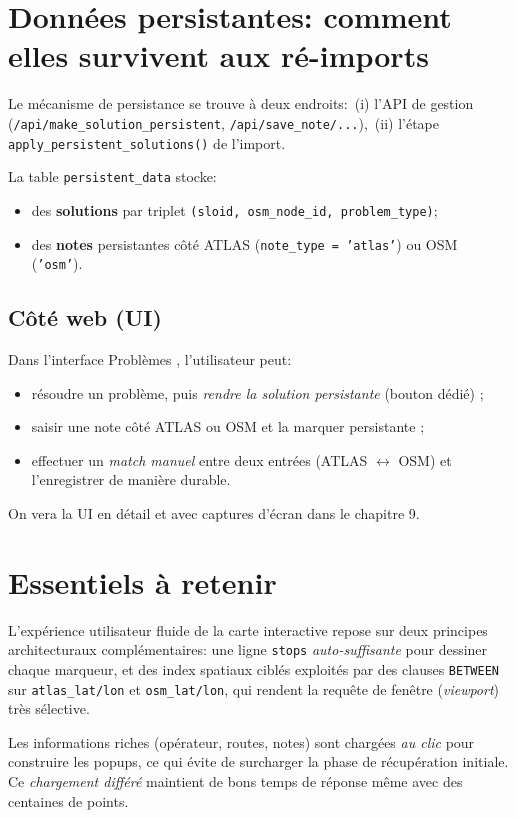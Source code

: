 \section{Données persistantes: comment elles survivent aux ré-imports}
Le mécanisme de persistance se trouve à deux endroits:\ (i) l'API de gestion (\texttt{/api/make\_solution\_persistent}, \texttt{/api/save\_note/...}),\ (ii) l'étape \texttt{apply\_persistent\_solutions()} de l'import.

La table \texttt{persistent\_data} stocke:
\begin{itemize}
  \item des \textbf{solutions} par triplet \texttt{(sloid, osm\_node\_id, problem\_type)};
  \item des \textbf{notes} persistantes côté ATLAS (\texttt{note\_type = 'atlas'}) ou OSM (\texttt{'osm'}).
\end{itemize}

\subsection*{Côté web (UI)}
Dans l'interface \og Problèmes \fg{}, l'utilisateur peut:
\begin{itemize}
  \item résoudre un problème, puis \textit{rendre la solution persistante} (bouton dédié) ;
  \item saisir une note côté ATLAS ou OSM et la marquer persistante ;
  \item effectuer un \textit{match manuel} entre deux entrées (ATLAS $\leftrightarrow$ OSM) et l'enregistrer de manière durable.
\end{itemize}
On vera la UI en détail et avec captures d'écran dans le chapitre 9.


\section{Essentiels à retenir}

L'expérience utilisateur fluide de la carte interactive repose sur deux principes architecturaux complémentaires: une ligne \texttt{stops} \emph{auto-suffisante} pour dessiner chaque marqueur, et des index spatiaux ciblés exploités par des clauses \texttt{BETWEEN} sur \texttt{atlas\_lat/lon} et \texttt{osm\_lat/lon}, qui rendent la requête de fenêtre (\textit{viewport}) très sélective.

Les informations riches (opérateur, routes, notes) sont chargées \textit{au clic} pour construire les popups, ce qui évite de surcharger la phase de récupération initiale. Ce \textit{chargement différé} maintient de bons temps de réponse même avec des centaines de points.

